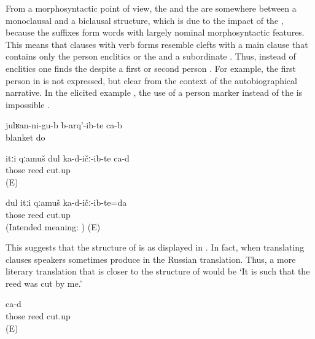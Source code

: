 From a morphosyntactic point of view, the  and the  are somewhere between a monoclausal and a biclausal structure, which is due to the impact of the , because the suffixes form words with largely nominal morphosyntactic features. This means that clauses with  verb forms resemble clefts with a main  clause that contains only the person enclitics or the  and a subordinate . Thus, instead of  enclitics one finds the  despite a first or second person . For example, the first person  in  is not expressed, but clear from the context of the autobiographical narrative. In the elicited example , the use of a person marker instead of the  is impossible .
%
\begin{exe}
	\ex	\label{ex:‎(I) gave birth to (my children) under a blanket analytic}
	\gll	julʁan-ni-gu-b	b-arq'-ib-te	ca-b\\
		blanket	do 	\\
	\glt	{}
\end{exe}

\begin{exe}
\ex
\begin{xlist}
	\ex	\label{ex:I cut that reed analytic}
	\gll	itːi	qːamuš	dul	ka-d-ičː-ib-te	ca-d\\
		those	reed		cut.up	\\
	\glt	{} (E)
	
		\ex	\label{Intended meaningI cut that reed.}
	\gll * dul itːi	qːamuš	ka-d-ičː-ib-te=da\\
	{}  those	reed cut.up \\
	\glt	{} (Intended meaning: ) (E)
\end{xlist}
\end{exe}

This suggests that the structure of  is as displayed in . In fact, when translating  clauses speakers sometimes produce  in the Russian translation. Thus, a more literary translation that is closer to the structure of  would be `It is such that the reed was cut by me.' 
%
\begin{exe}
	\ex	\label{ex:I cut that reed Russian relative clause analytic}
		ca-d\\
		those	reed		cut.up	\\
	\glt	{} (E)
	

\end{exe}

